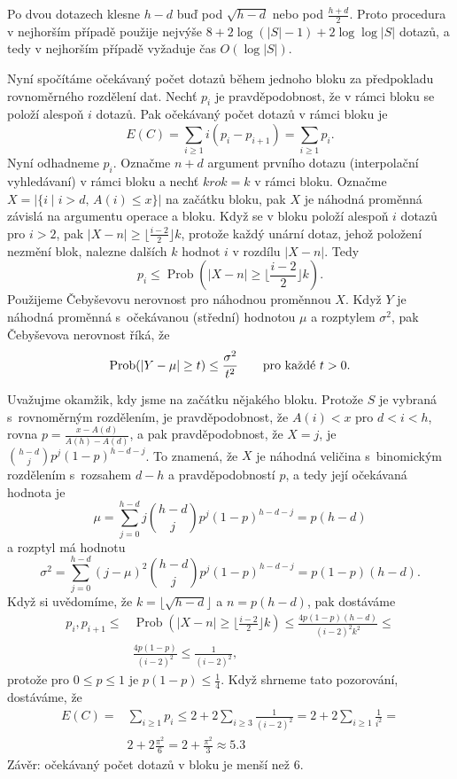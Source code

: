 \documentclass[a4paper,12pt]{article}
\DeclareMathOperator*{\Prob}{Prob}
\begin{document}
Po dvou dotazech klesne $h-d$ buď pod $\sqrt {h-d}$ nebo pod 
$\frac {h+d}2$. Proto procedura v nejhorším případě použije 
nejvýše $8+2\log(|S|-1)+2\log\log|S|$ dotazů, a tedy v nejhorším 
případě vyžaduje čas $O(\log|S|)$.

Nyní spočítáme očekávaný počet dotazů 
během jednoho bloku za předpokladu rovnoměr\-ného rozdělení dat. Nechť $p_i$ je prav\-dě\-podobnost, že 
v rámci bloku se položí ales\-poň $i$ dotazů. Pak 
očekávaný počet dotazů v rámci bloku je 
$$E(C)=\sum_{i\ge 1}i(p_i-p_{i+1})=\sum_{i\ge 1}p_i.$$
Nyní odhadneme $p_i$.  Označme $n+d$ argument prvního dotazu 
(interpolační vyhledávaní) v rámci bloku a nechť $
krok=k$ 
v rámci bloku.  Označme $X=|\{i\mid i>d,\,A(i)\le x\}|$ na 
začátku bloku, pak $X$ je náhodná proměnná závislá na 
argumentu ope\-race a bloku.  Když se v bloku položí 
alespoň $i$ dotazů pro $i>2$, pak $|X-n|\ge\lfloor\frac {
i-2}2\rfloor k$, 
protože každý unární dotaz, jehož položení  
nezmění blok, nalezne dalších $k$ hodnot $i$ v rozdílu $|X-n|$. 
Tedy 
$$p_i\le\Prob(|X-n|\ge\lfloor\frac {i-2}2\rfloor k).$$
Použijeme Čebyševovu nerovnost pro náhodnou 
proměn\-nou $X$. Když $Y$ je náhodná proměnná s~očekávanou 
(střední) hodnotou $\mu$ a rozptylem $\sigma^2$, pak Čebyševova 
nerovnost říká, že 
$$\Prob(|Y-\mu |\ge t)\le\frac {\sigma^2}{t^2}\qquad\text{\rm pro každé }
t>0.$$

Uvažujme okamžik, kdy jsme na začátku nějakého 
bloku. Pro\-tože $S$ je vybraná s~rovno\-měr\-ným rozdělením, je 
pravděpodob\-nost, že $A(i)<x$ pro $d<i<h$, rovna 
$p=\frac {x-A(d)}{A(h)-A(d)}$, a pak pravděpodobnost, že 
$X=j$, je $\binom {h-d}jp^j(1-p)^{h-d-j}$. To znamená, že $X$ je náhodná 
veličina s~binomickým rozdělením s~rozsahem $d-h$ a pravděpodobností $p$, a tedy její očekávaná 
hodnota je
$$\mu =\sum_{j=0}^{h-d}j\binom {h-d}jp^j(1-p)^{h-d-j}=p(h-d)$$
a rozptyl má hodnotu 
$$\sigma^2=\sum_{j=0}^{h-d}(j-\mu )^2\binom {h-d}jp^j(1-p)^{h-d-j}
=p(1-p)(h-d).$$
Když si uvědomíme, že $k=\lfloor\sqrt {h-d}\rfloor$ a $
n=p(h-d)$, pak dostáváme
\begin{align*} p_i,p_{i+1}\le&\Prob(|X-n|\ge\lfloor\frac {i-2}2\rfloor k 
)\le\frac {4p(1-p)(h-d)}{(i-2)^2k^2}\le\\
&\frac {4p(1-p)}{(i-2)^2}\le\frac 1{(i-2)^2},\end{align*}
protože pro $0\le p\le 1$ je $p(1-p)\le\frac 14$. Když shrneme tato pozorování, 
dostává\-me, že 
\begin{align*} E(C)=&\sum_{i\ge 1}p_i\le 2+2\sum_{i\ge 3}\frac 1{(i-2)^2}=
2+2\sum_{i\ge 1}\frac 1{i^2}=\\
&2+2\frac {\pi^2}6=2+\frac {\pi^2}3\approx 5.3\end{align*}
Závěr: očekávaný počet dotazů v bloku je menší než $
6$.
\end{document}
